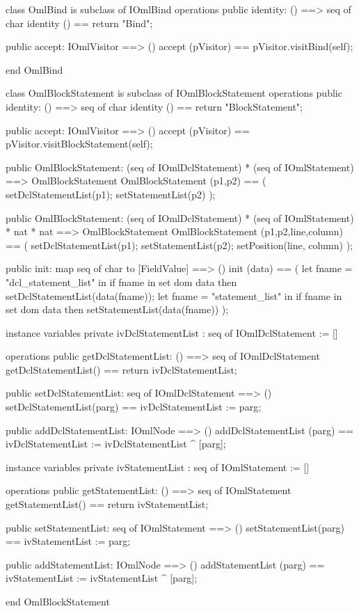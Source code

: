 \begin{vdm_al}
class OmlBind is subclass of IOmlBind
operations
  public identity: () ==> seq of char
  identity () == return "Bind";

  public accept: IOmlVisitor ==> ()
  accept (pVisitor) == pVisitor.visitBind(self);

end OmlBind
\end{vdm_al}
\begin{vdm_al}
class OmlBlockStatement is subclass of IOmlBlockStatement
operations
  public identity: () ==> seq of char
  identity () == return "BlockStatement";

  public accept: IOmlVisitor ==> ()
  accept (pVisitor) == pVisitor.visitBlockStatement(self);

  public OmlBlockStatement:
    (seq of IOmlDclStatement) *
    (seq of IOmlStatement) ==> OmlBlockStatement
  OmlBlockStatement (p1,p2) == 
    ( setDclStatementList(p1);
      setStatementList(p2) );

  public OmlBlockStatement:
    (seq of IOmlDclStatement) *
    (seq of IOmlStatement) *
    nat *
    nat ==> OmlBlockStatement
  OmlBlockStatement (p1,p2,line,column) == 
    ( setDclStatementList(p1);
      setStatementList(p2);
      setPosition(line, column) );

  public init: map seq of char to [FieldValue] ==> ()
  init (data) ==
    ( let fname = "dcl_statement_list" in
        if fname in set dom data
        then setDclStatementList(data(fname));
      let fname = "statement_list" in
        if fname in set dom data
        then setStatementList(data(fname)) );

instance variables
  private ivDclStatementList : seq of IOmlDclStatement := []

operations
  public getDclStatementList: () ==> seq of IOmlDclStatement
  getDclStatementList() == return ivDclStatementList;

  public setDclStatementList: seq of IOmlDclStatement ==> ()
  setDclStatementList(parg) == ivDclStatementList := parg;

  public addDclStatementList: IOmlNode ==> ()
  addDclStatementList (parg) == ivDclStatementList := ivDclStatementList ^ [parg];

instance variables
  private ivStatementList : seq of IOmlStatement := []

operations
  public getStatementList: () ==> seq of IOmlStatement
  getStatementList() == return ivStatementList;

  public setStatementList: seq of IOmlStatement ==> ()
  setStatementList(parg) == ivStatementList := parg;

  public addStatementList: IOmlNode ==> ()
  addStatementList (parg) == ivStatementList := ivStatementList ^ [parg];

end OmlBlockStatement
\end{vdm_al}


